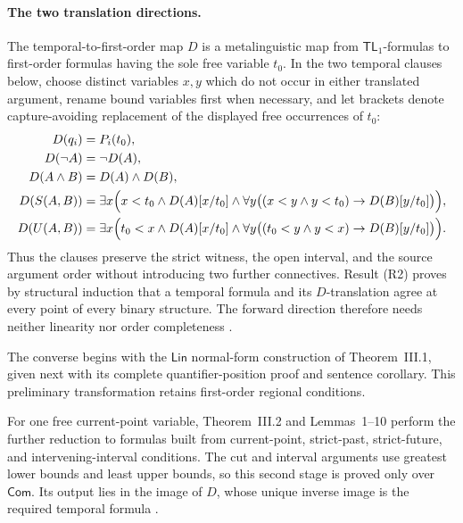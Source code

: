 \paragraph{The two translation directions.}
The temporal-to-first-order map \(D\) is a metalinguistic map from
\(\mathsf{TL}_1\)-formulas to first-order formulas having the sole free
variable \(t_0\).  In the two temporal clauses below, choose distinct
variables \(x,y\) which do not occur in either translated argument, rename
bound variables first when necessary, and let brackets denote
capture-avoiding replacement of the displayed free occurrences of \(t_0\):
\[
\begin{aligned}
 D(q_i)&=P_i(t_0),\\
 D(\neg A)&=\neg D(A),\\
 D(A\land B)&=D(A)\land D(B),\\
 D(S(A,B))
 &=
 \exists x\Bigl(
   x<t_0\land D(A)[x/t_0]\land
   \forall y\bigl((x<y\land y<t_0)\rightarrow D(B)[y/t_0]\bigr)
 \Bigr),\\
 D(U(A,B))
 &=
 \exists x\Bigl(
   t_0<x\land D(A)[x/t_0]\land
   \forall y\bigl((t_0<y\land y<x)\rightarrow D(B)[y/t_0]\bigr)
 \Bigr).
\end{aligned}
\]
Thus the clauses preserve the strict witness, the open interval, and the
source argument order without introducing two further connectives.  Result
(R2) proves by structural induction that a temporal formula and its
\(D\)-translation agree at every point of every binary structure.  The
forward direction therefore needs neither linearity nor order completeness
\cite[ch.~III, pp.~39--42]{Kamp1968}.

The converse begins with the \(\mathsf{Lin}\) normal-form construction of
Theorem~III.1, given next with its complete quantifier-position proof and
sentence corollary.  This preliminary transformation retains first-order
regional conditions.



For one free current-point variable,
Theorem~III.2 and Lemmas~1--10 perform the further reduction to formulas built
from current-point, strict-past, strict-future, and intervening-interval
conditions.  The cut and interval arguments use greatest lower bounds and
least upper bounds, so this second stage is proved only over
\(\mathsf{Com}\).  Its output lies in the image of \(D\), whose unique inverse
image is the required temporal formula
\cite[ch.~III, pp.~48--94]{Kamp1968}.















